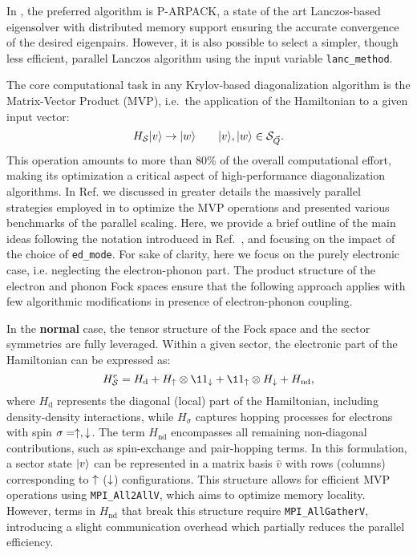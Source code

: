 \documentclass[edipack_sp.tex]{subfiles}
\begin{document}
In \NAME, the preferred algorithm is P-ARPACK, a state of the art
Lanczos-based eigensolver with distributed memory support
\cite{Lehoucq1998} ensuring the accurate convergence of the desired eigenpairs. 
However, it is also possible to select a simpler,
though less efficient, parallel Lanczos algorithm using the input variable {\tt lanc\_method}.

The core computational task in any Krylov-based diagonalization
algorithm is the Matrix-Vector Product (MVP), i.e.~the application
of the Hamiltonian to a given input vector:
\begin{equation}
H_{\cal S} |v\rangle \to |w\rangle\qquad |v\rangle,|w\rangle\in {\cal S}_{\vec{Q}}.
\end{equation}
This operation amounts to more than 80\% of the overall
computational effort, making its optimization a critical aspect of
high-performance diagonalization algorithms. In Ref. \cite{Amaricci2022CPC} we discussed in greater details the massively parallel strategies  employed in \NAME to optimize the MVP operations and presented various benchmarks of the parallel scaling. 
Here, we provide a brief outline of the main ideas following the notation introduced
in Ref.~, and focusing on the impact of the choice of {\tt ed\_mode}. 
For sake of clarity, here we focus on the purely electronic case, i.e. neglecting the electron-phonon part. The product structure of the electron and phonon Fock spaces ensure that the following approach applies with few algorithmic modifications in presence of electron-phonon coupling.  



In the {\bf normal} case, the tensor structure of the Fock space and the sector
symmetries are fully leveraged. Within a given sector, the electronic
part of the Hamiltonian can be expressed as:
\begin{equation}
H^e_{\SS} = H_\mathrm{d} + H_\up\otimes \11_\dw + \11_\up\otimes
H_\dw + H_\mathrm{nd},
\label{HssNormal}
\end{equation}
where $H_\mathrm{d}$ represents the diagonal (local) part of the
Hamiltonian, including density-density interactions, while
$H_\sigma$ captures hopping processes for electrons with spin
$\sigma=\uparrow,\downarrow$. The term $H_\mathrm{nd}$ encompasses all remaining
non-diagonal contributions, such as spin-exchange and pair-hopping
terms.
%
In this formulation, a sector state $|v\rangle$ can be
represented in a matrix basis $\hat{v}$ with rows (columns)
corresponding to $\uparrow$ ($\downarrow$) configurations. This structure allows
for efficient MVP operations using {\tt MPI\_All2AllV}, which aims to
optimize memory locality. However, terms in $H_\mathrm{nd}$ that
break this structure require {\tt MPI\_AllGatherV}, introducing a
slight communication overhead which partially reduces the parallel efficiency.
\end{document}
